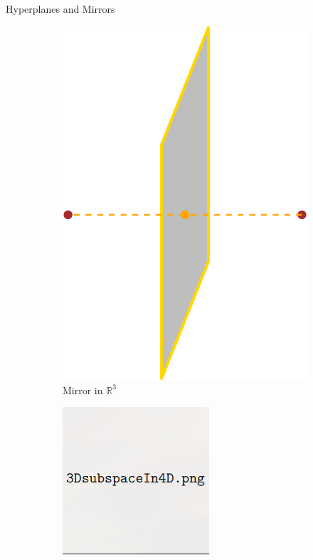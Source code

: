 \documentclass[aspectratio=169,xcolor=dvipsnames]{beamer}
\begin{document}
\begin{frame}{Hyperplanes and Mirrors}
\begin{figure}
\begin{subfigure}[t]{0.3\textwidth}
        \includegraphics[width=0.9\linewidth]{mirror1.png}
        \caption{Mirror in $\mathbb{R}^3$}
        \label{fig:subim2}
    \end{subfigure}
    \hspace{0.3cm}
    \begin{subfigure}[t]{0.3\textwidth}
        \centering
        \includegraphics[width=0.9\linewidth]{3DsubspaceIn4D.png}

\end{subfigure}
\end{figure}
\end{frame}
\end{document}
